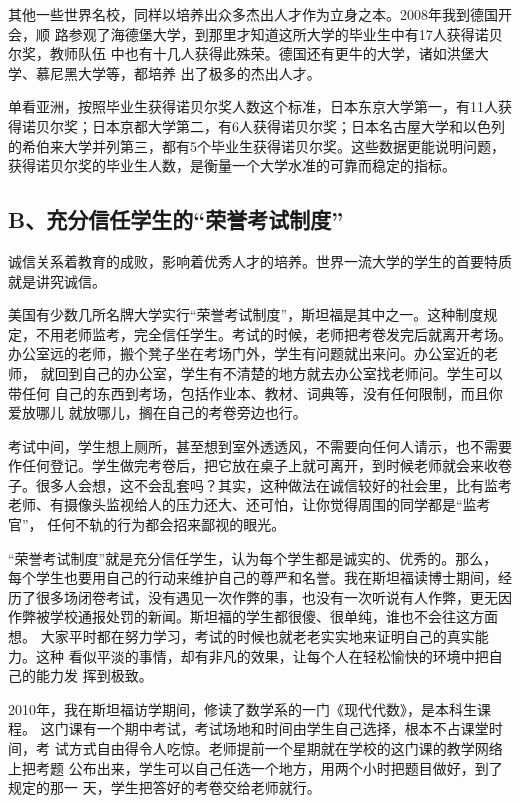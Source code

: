 \documentclass[11pt]{ctexart}
\begin{document}
{{{{其他一些世界名校，同样以培养出众多杰出人才作为立身之本。2008年我到德国开会，顺
路参观了海德堡大学，到那里才知道这所大学的毕业生中有17人获得诺贝尔奖，教师队伍
中也有十几人获得此殊荣。德国还有更牛的大学，诸如洪堡大学、慕尼黑大学等，都培养
出了极多的杰出人才。


单看亚洲，按照毕业生获得诺贝尔奖人数这个标准，日本东京大学第一，有11人获
得诺贝尔奖；日本京都大学第二，有6人获得诺贝尔奖；日本名古屋大学和以色列
的希伯来大学并列第三，都有5个毕业生获得诺贝尔奖。这些数据更能说明问题，
获得诺贝尔奖的毕业生人数，是衡量一个大学水准的可靠而稳定的指标。




\subsection{B、充分信任学生的“荣誉考试制度”}
\label{sec:orgf144614}

诚信关系着教育的成败，影响着优秀人才的培养。世界一流大学的学生的首要特质
就是讲究诚信。


美国有少数几所名牌大学实行“荣誉考试制度”，斯坦福是其中之一。这种制度规
定，不用老师监考，完全信任学生。考试的时候，老师把考卷发完后就离开考场。
办公室远的老师，搬个凳子坐在考场门外，学生有问题就出来问。办公室近的老师，
就回到自己的办公室，学生有不清楚的地方就去办公室找老师问。学生可以带任何
自己的东西到考场，包括作业本、教材、词典等，没有任何限制，而且你爱放哪儿
就放哪儿，搁在自己的考卷旁边也行。


考试中间，学生想上厕所，甚至想到室外透透风，不需要向任何人请示，也不需要
作任何登记。学生做完考卷后，把它放在桌子上就可离开，到时候老师就会来收卷
子。很多人会想，这不会乱套吗？其实，这种做法在诚信较好的社会里，比有监考
老师、有摄像头监视给人的压力还大、还可怕，让你觉得周围的同学都是“监考官”，
任何不轨的行为都会招来鄙视的眼光。


“荣誉考试制度”就是充分信任学生，认为每个学生都是诚实的、优秀的。那么，
每个学生也要用自己的行动来维护自己的尊严和名誉。我在斯坦福读博士期间，经
历了很多场闭卷考试，没有遇见一次作弊的事，也没有一次听说有人作弊，更无因
作弊被学校通报处罚的新闻。斯坦福的学生都很傻、很单纯，谁也不会往这方面想。
大家平时都在努力学习，考试的时候也就老老实实地来证明自己的真实能力。这种
看似平淡的事情，却有非凡的效果，让每个人在轻松愉快的环境中把自己的能力发
挥到极致。


2010年，我在斯坦福访学期间，修读了数学系的一门《现代代数》，是本科生课程。
这门课有一个期中考试，考试场地和时间由学生自己选择，根本不占课堂时间，考
试方式自由得令人吃惊。老师提前一个星期就在学校的这门课的教学网络上把考题
公布出来，学生可以自己任选一个地方，用两个小时把题目做好，到了规定的那一
天，学生把答好的考卷交给老师就行。


}}}}
\end{document}
